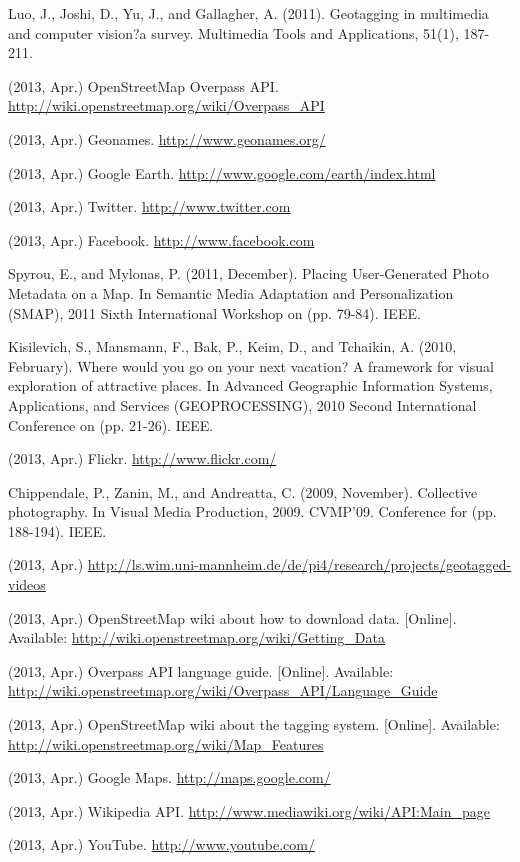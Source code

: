\documentclass[journal]{IEEEtran}
\begin{document}
\begin{thebibliography}{1}

Luo, J., Joshi, D., Yu, J., and Gallagher, A. (2011). Geotagging in multimedia and computer vision?a survey. Multimedia Tools and Applications, 51(1), 187-211.

(2013, Apr.) OpenStreetMap Overpass API. \url{http://wiki.openstreetmap.org/wiki/Overpass_API}

(2013, Apr.) Geonames. \url{http://www.geonames.org/}

(2013, Apr.) Google Earth. \url{http://www.google.com/earth/index.html}

(2013, Apr.) Twitter. \url{http://www.twitter.com}

(2013, Apr.) Facebook. \url{http://www.facebook.com}

Spyrou, E., and Mylonas, P. (2011, December). Placing User-Generated Photo Metadata on a Map. In Semantic Media Adaptation and Personalization (SMAP), 2011 Sixth International Workshop on (pp. 79-84). IEEE.

Kisilevich, S., Mansmann, F., Bak, P., Keim, D., and Tchaikin, A. (2010, February). Where would you go on your next vacation? A framework for visual exploration of attractive places. In Advanced Geographic Information Systems, Applications, and Services (GEOPROCESSING), 2010 Second International Conference on (pp. 21-26). IEEE.

(2013, Apr.) Flickr. \url{http://www.flickr.com/}

Chippendale, P., Zanin, M., and Andreatta, C. (2009, November). Collective photography. In Visual Media Production, 2009. CVMP'09. Conference for (pp. 188-194). IEEE.

(2013, Apr.) \url{http://ls.wim.uni-mannheim.de/de/pi4/research/projects/geotagged-videos}

(2013, Apr.) OpenStreetMap wiki about how to download data. [Online]. Available: \url{http://wiki.openstreetmap.org/wiki/Getting_Data}

(2013, Apr.) Overpass API language guide. [Online]. Available: \url{http://wiki.openstreetmap.org/wiki/Overpass_API/Language_Guide}

(2013, Apr.) OpenStreetMap wiki about the tagging system. [Online]. Available: \url{http://wiki.openstreetmap.org/wiki/Map_Features}

(2013, Apr.) Google Maps. \url{http://maps.google.com/}

(2013, Apr.) Wikipedia API. \url{http://www.mediawiki.org/wiki/API:Main_page}

(2013, Apr.) YouTube. \url{http://www.youtube.com/}

\end{thebibliography}
\end{document}
